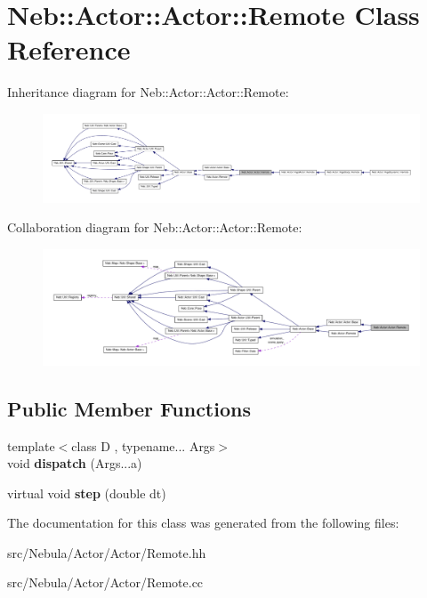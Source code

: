 \hypertarget{classNeb_1_1Actor_1_1Actor_1_1Remote}{\section{\-Neb\-:\-:\-Actor\-:\-:\-Actor\-:\-:\-Remote \-Class \-Reference}
\label{classNeb_1_1Actor_1_1Actor_1_1Remote}
}


\-Inheritance diagram for \-Neb\-:\-:\-Actor\-:\-:\-Actor\-:\-:\-Remote\-:\nopagebreak
\begin{figure}[H]
\begin{center}
\leavevmode
\includegraphics[width=350pt]{classNeb_1_1Actor_1_1Actor_1_1Remote__inherit__graph}
\end{center}
\end{figure}


\-Collaboration diagram for \-Neb\-:\-:\-Actor\-:\-:\-Actor\-:\-:\-Remote\-:\nopagebreak
\begin{figure}[H]
\begin{center}
\leavevmode
\includegraphics[width=350pt]{classNeb_1_1Actor_1_1Actor_1_1Remote__coll__graph}
\end{center}
\end{figure}
\subsection*{\-Public \-Member \-Functions}
\begin{DoxyCompactItemize}
\item 
\hypertarget{classNeb_1_1Actor_1_1Actor_1_1Remote_a9a374227bd61afc31fc981905f671317}{{\footnotesize template$<$class D , typename... \-Args$>$ }\\void {\bfseries dispatch} (\-Args...\-a)}\label{classNeb_1_1Actor_1_1Actor_1_1Remote_a9a374227bd61afc31fc981905f671317}

\item 
\hypertarget{classNeb_1_1Actor_1_1Actor_1_1Remote_a613b3e4920c62b8083f3f4ba3d204efb}{virtual void {\bfseries step} (double dt)}\label{classNeb_1_1Actor_1_1Actor_1_1Remote_a613b3e4920c62b8083f3f4ba3d204efb}

\end{DoxyCompactItemize}


\-The documentation for this class was generated from the following files\-:\begin{DoxyCompactItemize}
\item 
src/\-Nebula/\-Actor/\-Actor/\-Remote.\-hh\item 
src/\-Nebula/\-Actor/\-Actor/\-Remote.\-cc\end{DoxyCompactItemize}
